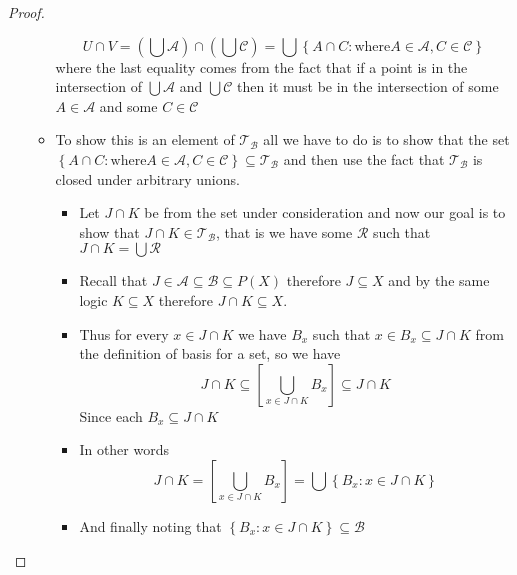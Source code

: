 \begin{proof}
\begin{itemize}
\begin{itemize}
{            } \)
                \[
                U \cap V = \left(\bigcup \mathcal{A}\right) \cap \left(
                \bigcup \mathcal{C}\right) = \bigcup \left\{A \cap C:
                \text{where} A \in \mathcal{A}, C \in \mathcal{C}
                \right\}
                \]
                where the last equality comes from the fact that if a point is
                in the intersection of \(\bigcup \mathcal{A} \) and \(\bigcup
                \mathcal{C} \) then it must be in the intersection of some \(A
                \in \mathcal{A} \) and some \(C \in \mathcal{C} \)
            \item To show this is an element of \(\mathcal{T} _{\mathcal{B}
            } \) all we have to do is to show that the set \(\left\{A \cap C:
            \text{where} A \in \mathcal{A}, C \in \mathcal{C}
            \right\} \subseteq \mathcal{T} _{\mathcal{B}} \) and then use
            the fact that \(\mathcal{T} _{\mathcal{B}} \) is closed under
            arbitrary unions.
            \begin{itemize}
                \item Let \(J \cap K \) be from the set under consideration and
                now our goal is to show that \(J \cap K \in \mathcal{T} _{
                \mathcal{B}} \), that is we have some \(\mathcal{R} \) such
                that \(J \cap K = \bigcup \mathcal{R} \)
                \item Recall that \(J \in \mathcal{A} \subseteq \mathcal{B}
                \subseteq P\left(X\right) \) therefore \(J \subseteq X \) and
                by the same logic \(K \subseteq X \) therefore \(J \cap K
                \subseteq X \).
                \item Thus for every \(x \in J \cap K \) we have \(B_{x} \)
                such that \(x \in B_{x} \subseteq J \cap K \) from the
                definition of basis for a set, so we have
                    \[
                    J \cap K \subseteq \left[ \bigcup _{x \in J \cap K} B_{x
                    } \right] \subseteq J \cap K
                    \]
                    Since each \(B_{x} \subseteq J \cap K \)
                \item In other words
                    \[
                    J \cap K = \left[ \bigcup _{x \in J \cap K} B_{x}
                    \right] = \bigcup \left\{B_{x} : x \in J \cap K \right\}
                    \]
                \item And finally noting that \(\left\{B_{x} : x \in J \cap K
                \right\} \subseteq \mathcal{B} \)
            \end{itemize}
        \end{itemize}
    \end{itemize}
\end{proof}
